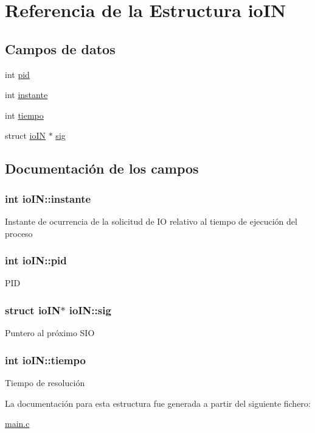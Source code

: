 \hypertarget{structioIN}{\section{Referencia de la Estructura io\-I\-N}
\label{structioIN}
}
\subsection*{Campos de datos}
\begin{DoxyCompactItemize}
\item 
int \hyperlink{structioIN_aadf419fd3278a7b1c9010904a94d0ba8}{pid}
\item 
int \hyperlink{structioIN_a5d100c0935342326f25ab087b927f105}{instante}
\item 
int \hyperlink{structioIN_a906187b442eb29c2f5d4010c8eff25de}{tiempo}
\item 
struct \hyperlink{structioIN}{io\-I\-N} $\ast$ \hyperlink{structioIN_a80f3020d7d5acb9acc98b6990defdde8}{sig}
\end{DoxyCompactItemize}


\subsection{Documentación de los campos}
\hypertarget{structioIN_a5d100c0935342326f25ab087b927f105}{
\subsubsection[{instante}]{\setlength{\rightskip}{0pt plus 5cm}int io\-I\-N\-::instante}}\label{structioIN_a5d100c0935342326f25ab087b927f105}
Instante de ocurrencia de la solicitud de I\-O relativo al tiempo de ejecución del proceso \hypertarget{structioIN_aadf419fd3278a7b1c9010904a94d0ba8}{
\subsubsection[{pid}]{\setlength{\rightskip}{0pt plus 5cm}int io\-I\-N\-::pid}}\label{structioIN_aadf419fd3278a7b1c9010904a94d0ba8}
P\-I\-D \hypertarget{structioIN_a80f3020d7d5acb9acc98b6990defdde8}{
\subsubsection[{sig}]{\setlength{\rightskip}{0pt plus 5cm}struct {\bf io\-I\-N}$\ast$ io\-I\-N\-::sig}}\label{structioIN_a80f3020d7d5acb9acc98b6990defdde8}
Puntero al próximo S\-I\-O \hypertarget{structioIN_a906187b442eb29c2f5d4010c8eff25de}{
\subsubsection[{tiempo}]{\setlength{\rightskip}{0pt plus 5cm}int io\-I\-N\-::tiempo}}\label{structioIN_a906187b442eb29c2f5d4010c8eff25de}
Tiempo de resolución 

La documentación para esta estructura fue generada a partir del siguiente fichero\-:\begin{DoxyCompactItemize}
\item 
\hyperlink{main_8c}{main.\-c}\end{DoxyCompactItemize}
